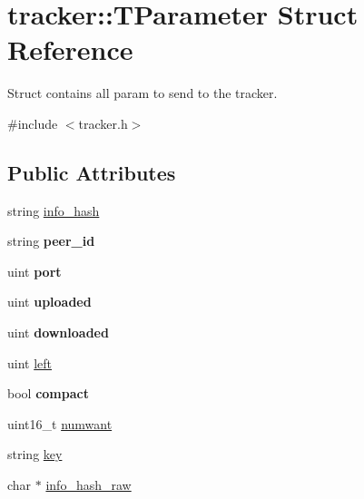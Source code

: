 \hypertarget{structtracker_1_1TParameter}{}\section{tracker\+:\+:T\+Parameter Struct Reference}
\label{structtracker_1_1TParameter}


Struct contains all param to send to the tracker.  




{\ttfamily \#include $<$tracker.\+h$>$}

\subsection*{Public Attributes}
\begin{DoxyCompactItemize}
\item 
string \hyperlink{structtracker_1_1TParameter_aefb0050bfd99eb6a30b547b3e8891dcd}{info\+\_\+hash}
\item 
\mbox{\label{structtracker_1_1TParameter_aa4fecf8ffb04fac7e3929cef30f032ac}} 
string {\bfseries peer\+\_\+id}
\item 
\mbox{\label{structtracker_1_1TParameter_a37c80391b4706f15068938a5186ebcb5}} 
uint {\bfseries port}
\item 
\mbox{\label{structtracker_1_1TParameter_aca491cdfef7ea15eb10768389dd8d043}} 
uint {\bfseries uploaded}
\item 
\mbox{\label{structtracker_1_1TParameter_a4e7ad869a2a84c1773fa97e2f8ac7a70}} 
uint {\bfseries downloaded}
\item 
uint \hyperlink{structtracker_1_1TParameter_ac4cfc3ad1c6e7cf4301d1940723e331a}{left}
\item 
\mbox{\label{structtracker_1_1TParameter_aa20b3bfd0be9058a717e277e917a1604}} 
bool {\bfseries compact}
\item 
uint16\+\_\+t \hyperlink{structtracker_1_1TParameter_a21bb71f791e005b04f27d2d1ea1b7907}{numwant}
\item 
string \hyperlink{structtracker_1_1TParameter_a54bbbc985f11ea3d022d24e2dd9d8a92}{key}
\item 
char $\ast$ \hyperlink{structtracker_1_1TParameter_ae88632924fe55b815994a2dc2bce67a2}{info\+\_\+hash\+\_\+raw}
\end{DoxyCompactItemize}


